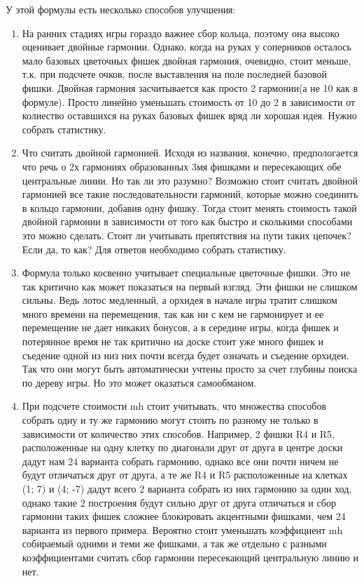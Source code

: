\documentclass[a4paper,12pt]{diplom}
\begin{document}
У этой формулы есть несколько способов улучшения:
\begin{enumerate}[label=\arabic{enumi})]
	\item На ранних стадиях игры гораздо важнее сбор кольца, поэтому она высоко оценивает двойные гармонии. Однако, когда на руках у соперников осталось мало базовых цветочных фишек двойная гармония, очевидно, стоит меньше, т.к. при подсчете очков, после выставления на поле последней базовой фишки. Двойная гармония засчитывается как просто 2 гармонии(а не 10 как в формуле). Просто линейно уменьшать стоимость от 10 до 2 в зависимости от колиество оставшихся на руках базовых фишек вряд ли хорошая идея. Нужно собрать статистику.
	\item Что считать двойной гармонией. Исходя из названия, конечно, предпологается что речь о 2х гармониях образованных 3мя фишками и пересекающих обе центральные линии. Но так ли это разумно? Возможно стоит считать двойной гармонией все такие последовательности гармоний, которые можно соединить в кольцо гармонии, добавив одну фишку. Тогда стоит менять стоимость такой двойной гармонии в зависимости от того как быстро и сколькими способами это можно сделать. Стоит ли учитывать препятствия на пути таких цепочек? Если да, то как? Для ответов необходимо собрать статистику.
	\item Формула только косвенно учитывает специальные цветочные фишки. Это не так критично как может показаться на первый взгляд. Эти фишки не слишком сильны. Ведь лотос медленный, а орхидея в начале игры тратит слишком много времени на перемещения, так как ни с кем не гармонирует и ее перемещение не дает никаких бонусов, а в середине игры, когда фишек и потерянное время не так критично на доске стоит уже много фишек и съедение одной из низ них почти всегда будет означать и съедение орхидеи. Так что они могут быть автоматически учтены просто за счет глубины поиска по дереву игры. Но это может оказаться самообманом. 
	\item При подсчете стоимости mh стоит учитывать, что множества способов собрать одну и ту же гармонию могут стоить по разному не только в зависимости от количество этих способов. Например, 2 фишки R4 и R5, расположенные на одну клетку по диагонали друг от друга в центре доски дадут нам 24 варианта собрать гармонию, однако все они почти ничем не будут отличаться друг от друга, а те же R4 и R5 расположенные на клетках (1; 7) и (4; -7) дадут всего 2 варианта собрать из них гармонию за один ход, однако такие 2 построения будут сильно друг от друга отличаться и сбор гармонии таких фишек сложнее блокировать акцентными фишками, чем 24 варианта из первого примера. Вероятно стоит уменьшать коэффициент mh собираемый одними и теми же фишками, а так же отдельно с разными коэффициентами считать сбор гармонии пересекающий центральную линию и нет.
\end{enumerate}
\end{document}
